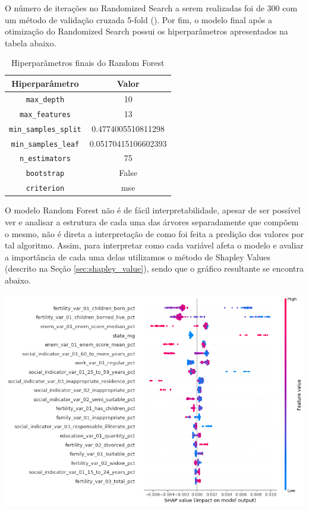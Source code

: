 O número de iterações no Randomized Search a serem realizadas foi de 300 com um método de validação cruzada 5-fold (\citet{Kohavi1995}). Por fim, o modelo final após a otimização do Randomized Search possui os hiperparâmetros apresentados na tabela abaixo.

\begin{table}[h]
\centering
\caption{Hiperparâmetros finais do Random Forest}
\label{tab:cap3_parametros_random_forest}
\begin{tabular}{cc}
Hiperparâmetro & Valor \\
\hline
\verb|max_depth| & 10 \\
\verb|max_features| & 13 \\
\verb|min_samples_split| & 0.4774005510811298 \\
\verb|min_samples_leaf| & 0.05170415106602393 \\
\verb|n_estimators| & 75 \\
\verb|bootstrap| & False \\
\verb|criterion| & mse \\
\hline
\end{tabular}
\end{table}
\FloatBarrier

O modelo Random Forest não é de fácil interpretabilidade, apesar de ser possível ver e analisar a estrutura de cada uma das árvores separadamente que compõem o mesmo, não é direta a interpretação de como foi feita a predição dos valores por tal algoritmo. Assim, para interpretar como cada variável afeta o modelo e avaliar a importância de cada uma delas utilizamos o método de Shapley Values (descrito na Seção \ref{sec:shapley_value}), sendo que o gráfico resultante se encontra abaixo.

\graphicspath{ {./figuras/model_performance/} }
\begin{center}
\includegraphics[width=14.0cm, keepaspectratio]{cap3_shap_random_forest}
\label{ape:cap3_shap_random_forest}
\end{center}

